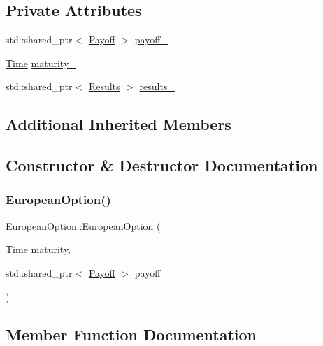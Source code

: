 \subsection*{Private Attributes}
\begin{DoxyCompactItemize}
\item 
std\+::shared\+\_\+ptr$<$ \hyperlink{class_payoff}{Payoff} $>$ \hyperlink{class_european_option_a3d597cb0b811f69a08e49b1af13b5a04}{payoff\+\_\+}
\item 
\hyperlink{_name_def_8h_ac2d3e0ba793497bcca555c7c2cf64ff3}{Time} \hyperlink{class_european_option_a8853b9bd1af9abc371630ae1c68f304c}{maturity\+\_\+}
\item 
std\+::shared\+\_\+ptr$<$ \hyperlink{class_european_option_1_1_results}{Results} $>$ \hyperlink{class_european_option_a228f13a5ce4c46caef1e3052b4a27610}{results\+\_\+}
\end{DoxyCompactItemize}
\subsection*{Additional Inherited Members}


\subsection{Constructor \& Destructor Documentation}
\hypertarget{class_european_option_a92132b61922cb628bc355d4d9f302513}{}\label{class_european_option_a92132b61922cb628bc355d4d9f302513} 
\subsubsection{\texorpdfstring{European\+Option()}{EuropeanOption()}}
{\footnotesize\ttfamily European\+Option\+::\+European\+Option (\begin{DoxyParamCaption}\item[{\hyperlink{_name_def_8h_ac2d3e0ba793497bcca555c7c2cf64ff3}{Time}}]{maturity,  }\item[{std\+::shared\+\_\+ptr$<$ \hyperlink{class_payoff}{Payoff} $>$}]{payoff }\end{DoxyParamCaption})}



\subsection{Member Function Documentation}
\hypertarget{class_european_option_ae234d562ef21dc24c25f1538860da1cf}{}\label{class_european_option_ae234d562ef21dc24c25f1538860da1cf} 
